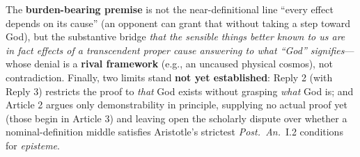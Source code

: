 The \textbf{burden-bearing premise} is not the near-definitional line ``every effect depends on its cause'' (an opponent can grant that without taking a step toward God), but the substantive bridge \emph{that the sensible things better known to us are in fact effects of a transcendent proper cause answering to what ``God'' signifies}---whose denial is a \textbf{rival framework} (e.g., an uncaused physical cosmos), not contradiction. Finally, two limits stand \textbf{not yet established}: Reply 2 (with Reply 3) restricts the proof to \emph{that} God exists without grasping \emph{what} God is; and Article 2 argues only demonstrability in principle, supplying no actual proof yet (those begin in Article 3) and leaving open the scholarly dispute over whether a nominal-definition middle satisfies Aristotle's strictest \emph{Post.\ An.}\ I.2 conditions for \emph{episteme}.
